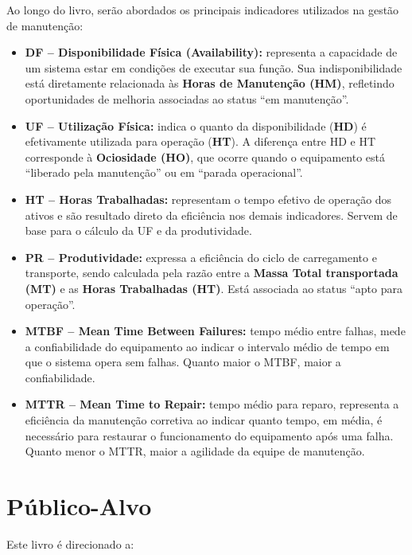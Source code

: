 \documentclass[
  letterpaper,
]{book}
\begin{document}
Ao longo do livro, serão abordados os principais indicadores utilizados
na gestão de manutenção:

\begin{itemize}
\item
  \textbf{DF -- Disponibilidade Física (Availability):} representa a
  capacidade de um sistema estar em condições de executar sua função.
  Sua indisponibilidade está diretamente relacionada às \textbf{Horas de
  Manutenção (HM)}, refletindo oportunidades de melhoria associadas ao
  status ``em manutenção''.
\item
  \textbf{UF -- Utilização Física:} indica o quanto da disponibilidade
  (\textbf{HD}) é efetivamente utilizada para operação (\textbf{HT}). A
  diferença entre HD e HT corresponde à \textbf{Ociosidade (HO)}, que
  ocorre quando o equipamento está ``liberado pela manutenção'' ou em
  ``parada operacional''.
\item
  \textbf{HT -- Horas Trabalhadas:} representam o tempo efetivo de
  operação dos ativos e são resultado direto da eficiência nos demais
  indicadores. Servem de base para o cálculo da UF e da produtividade.
\item
  \textbf{PR -- Produtividade:} expressa a eficiência do ciclo de
  carregamento e transporte, sendo calculada pela razão entre a
  \textbf{Massa Total transportada (MT)} e as \textbf{Horas Trabalhadas
  (HT)}. Está associada ao status ``apto para operação''.
\item
  \textbf{MTBF -- Mean Time Between Failures:} tempo médio entre falhas,
  mede a confiabilidade do equipamento ao indicar o intervalo médio de
  tempo em que o sistema opera sem falhas. Quanto maior o MTBF, maior a
  confiabilidade.
\item
  \textbf{MTTR -- Mean Time to Repair:} tempo médio para reparo,
  representa a eficiência da manutenção corretiva ao indicar quanto
  tempo, em média, é necessário para restaurar o funcionamento do
  equipamento após uma falha. Quanto menor o MTTR, maior a agilidade da
  equipe de manutenção.
\end{itemize}

\section*{Público-Alvo}\label{puxfablico-alvo}


Este livro é direcionado a:
\end{document}
